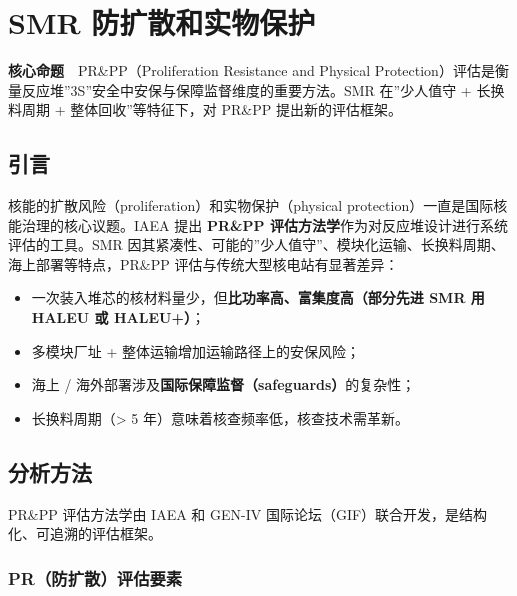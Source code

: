 \documentclass[
  UTF8,
  scheme=plain,
  fontsize=10pt,
  openany
]{ctexbook}
\begin{document}
\cleardoublepage

\chapter{SMR
防扩散和实物保护}\label{smr-ux9632ux6269ux6563ux548cux5b9eux7269ux4fddux62a4}

\begin{epigraph}

\textbf{核心命题}　PR\&PP（Proliferation Resistance and Physical
Protection）评估是衡量反应堆''3S''安全中安保与保障监督维度的重要方法。SMR
在''少人值守 + 长换料周期 + 整体回收''等特征下，对 PR\&PP
提出新的评估框架。

\end{epigraph}

\section{引言}\label{ux5f15ux8a00-8}

核能的扩散风险（proliferation）和实物保护（physical
protection）一直是国际核能治理的核心议题。IAEA 提出 \textbf{PR\&PP
评估方法学}作为对反应堆设计进行系统评估的工具。SMR
因其紧凑性、可能的''少人值守''、模块化运输、长换料周期、海上部署等特点，PR\&PP
评估与传统大型核电站有显著差异：

\begin{itemize}
\tightlist
\item
  一次装入堆芯的核材料量少，但\textbf{比功率高、富集度高（部分先进 SMR
  用 HALEU 或 HALEU+）}；
\item
  多模块厂址 + 整体运输增加运输路径上的安保风险；
\item
  海上 / 海外部署涉及\textbf{国际保障监督（safeguards）}的复杂性；
\item
  长换料周期（\textgreater{} 5 年）意味着核查频率低，核查技术需革新。
\end{itemize}

\section{分析方法}\label{ux5206ux6790ux65b9ux6cd5}

PR\&PP 评估方法学由 IAEA 和 GEN-IV
国际论坛（GIF）联合开发，是结构化、可追溯的评估框架。

\subsection{PR（防扩散）评估要素}\label{prux9632ux6269ux6563ux8bc4ux4f30ux8981ux7d20}
\end{document}
